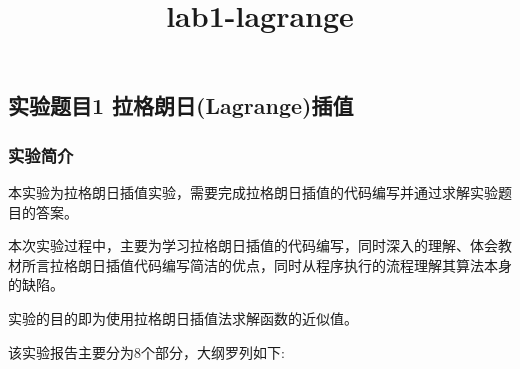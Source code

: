 \documentclass[11pt]{article}
\title{lab1-lagrange}
\begin{document}
    
    \maketitle
    
    

    
    \hypertarget{ux5b9eux9a8cux9898ux76ee1-ux62c9ux683cux6717ux65e5lagrangeux63d2ux503c}{%
\subsection{实验题目1
拉格朗日(Lagrange)插值}\label{ux5b9eux9a8cux9898ux76ee1-ux62c9ux683cux6717ux65e5lagrangeux63d2ux503c}}

    \hypertarget{ux5b9eux9a8cux7b80ux4ecb}{%
\subsubsection{实验简介}\label{ux5b9eux9a8cux7b80ux4ecb}}

本实验为拉格朗日插值实验，需要完成拉格朗日插值的代码编写并通过求解实验题目的答案。

本次实验过程中，主要为学习拉格朗日插值的代码编写，同时深入的理解、体会教材所言拉格朗日插值代码编写简洁的优点，同时从程序执行的流程理解其算法本身的缺陷。

实验的目的即为使用拉格朗日插值法求解函数的近似值。

该实验报告主要分为8个部分，大纲罗列如下:
\end{document}
